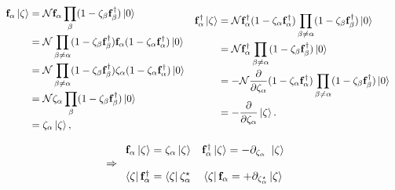\documentclass{homework}
\begin{document}
\begin{equation} \begin{array}{cc}
    \begin{split}
        {\bf f}_{\alpha} \ket{\zeta} &= \mathcal{N} {\bf f}_{\alpha} \prod_{\beta}  (1-\zeta_{\beta} {\bf f}_{\beta}^\dagger) \ket{0} \\
        & = \mathcal{N} \prod_{\beta \neq \alpha}  (1-\zeta_{\beta} {\bf f}_{\beta}^\dagger) {\bf f}_{\alpha}  (1-\zeta_{\alpha} {\bf f}_{\alpha}^\dagger) \ket{0} \\
        &= \mathcal{N} \prod_{\beta \neq \alpha}  (1-\zeta_{\beta} {\bf f}_{\beta}^\dagger) {\zeta}_{\alpha} (1-\zeta_{\alpha} {\bf f}_{\alpha}^\dagger) \ket{0} \\
        &= \mathcal{N} \zeta_{\alpha} \prod_{\beta}  (1-\zeta_{\beta} {\bf f}_{\beta}^\dagger) \ket{0} \\
        &= \zeta_{\alpha} \ket{\zeta},
    \end{split} & \begin{split}
         {\bf f}_{\alpha}^\dagger \ket{\zeta} 
         &= \mathcal{N}{\bf f}_{\alpha}^\dagger (1-\zeta_{\alpha} {\bf f}_{\alpha}^\dagger) \prod_{\beta \neq \alpha} (1-\zeta_{\beta} {\bf f}_{\beta}^\dagger) \ket{0} \\
         &= \mathcal{N}{\bf f}_{\alpha}^\dagger \prod_{\beta \neq \alpha} (1-\zeta_{\beta} {\bf f}_{\beta}^\dagger) \ket{0} \\
         &= - \mathcal{N}\frac{\partial}{\partial \zeta_\alpha} (1- \zeta_{\alpha} {\bf f}_{\alpha}^\dagger) \prod_{\beta \neq \alpha} (1-\zeta_{\beta} {\bf f}_{\beta}^\dagger) \ket{0} \\
         &= - \frac{\partial}{\partial \zeta_\alpha} \ket{\zeta}.
    \end{split} 
\end{array} 
\end{equation}

\begin{equation}
    \Rightarrow \begin{array}{cc}
    {{\bf f}}_{\alpha} \ket{\zeta} = \zeta_\alpha \ket{\zeta} & {{\bf f}}_{\alpha}^\dagger \ket{\zeta} = - \partial_{\zeta_\alpha} \textnormal{ } \ket{\zeta}  \\ 
    \\
    \bra{\zeta} {{\bf f}}_{\alpha}^\dagger = \bra{\zeta} \zeta_\alpha^\star & \bra{\zeta} {{\bf f}}_{\alpha} = + \partial_{\zeta_\alpha^\star} \ket{\zeta} \end{array}
\end{equation}
\end{document}
